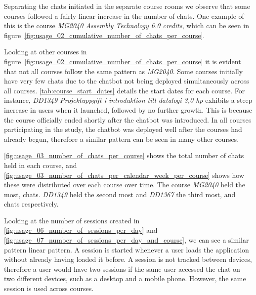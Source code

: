 





Separating the chats initiated in the separate course rooms we observe that some courses followed a fairly linear increase in the number of chats. One example of this is the course \textit{MG2040 Assembly Technology 6.0 credits}, which can be seen in figure~\ref{fig:usage_02_cumulative_number_of_chats_per_course}.





Looking at other courses in figure~\ref{fig:usage_02_cumulative_number_of_chats_per_course} it is evident that not all courses follow the same pattern as \textit{MG2040}. Some courses initially have very few chats due to the chatbot not being deployed simultaneously across all courses. \autoref{tab:course_start_dates} details the start dates for each course. For instance, \textit{DD1349 Projektuppgift i introduktion till datalogi 3,0 hp} exhibits a steep increase in users when it launched, followed by no further growth. This is because the course officially ended shortly after the chatbot was introduced. In all courses participating in the study, the chatbot was deployed well after the courses had already begun, therefore a similar pattern can be seen in many other courses.





\autoref{fig:usage_03_number_of_chats_per_course} shows the total number of chats held in each course, and \autoref{fig:usage_03_number_of_chats_per_calendar_week_per_course} shows how these were distributed over each course over time. The course \textit{MG2040} held the most, chats. \textit{DD1349} held the second most and \textit{DD1367} the third most, and chats respectively.










Looking at the number of sessions created in \autoref{fig:usage_06_number_of_sessions_per_day} and \autoref{fig:usage_07_number_of_sessions_per_day_and_course}, we can see a similar pattern linear pattern. A session is started whenever a user loads the application without already having loaded it before. A session is not tracked between devices, therefore a user would have two sessions if the same user accessed the chat on two different devices, such as a desktop and a mobile phone. However, the same session is used across courses.


